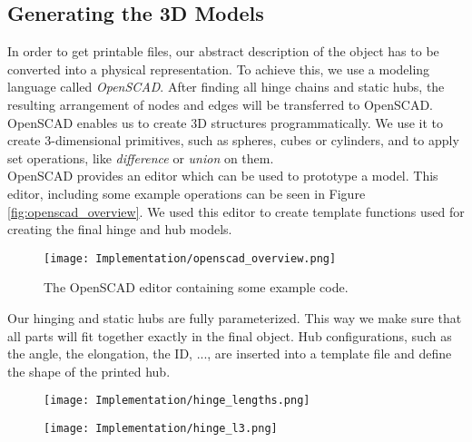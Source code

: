 \subsection{Generating the 3D Models}\label{sec:openscad_impl}
In order to get printable files, our abstract description of the object has to be converted into a physical representation. To achieve this, we use a modeling language called \textit{OpenSCAD}. After finding all hinge chains and static hubs, the resulting arrangement of nodes and edges will be transferred to OpenSCAD. OpenSCAD enables us to create 3D structures programmatically. We use it to create 3-dimensional primitives, such as spheres, cubes or cylinders, and to apply set operations, like \textit{difference} or \textit{union} on them.\\
OpenSCAD provides an editor which can be used to prototype a model. This editor, including some example operations can be seen in Figure \ref{fig:openscad_overview}. We used this editor to create template functions used for creating the final hinge and hub models.\\
\begin{figure}[h!]
    \texttt{[image: Implementation/openscad\_overview.png]}
    \centering
    \caption{The OpenSCAD editor containing some example code.}
    \label{fig:force_measurement}
\end{figure}
Our hinging and static hubs are fully parameterized. This way we make sure that all parts will fit together exactly in the final object. Hub configurations, such as the angle, the elongation, the ID, ..., are inserted into a template file and define the shape of the printed hub.

\begin{figure}[ht]
  \centering
  \begin{minipage}[t]{5cm}
    \centering
    \texttt{[image: Implementation/hinge\_lengths.png]}
    \label{fig:leg_asset}
  \end{minipage}%
  \vspace{3cm}
  \begin{minipage}[t]{5cm}
    \centering
    \texttt{[image: Implementation/hinge\_l3.png]}
    \label{fig:spider_in_progress}
  \end{minipage}
\end{figure}
